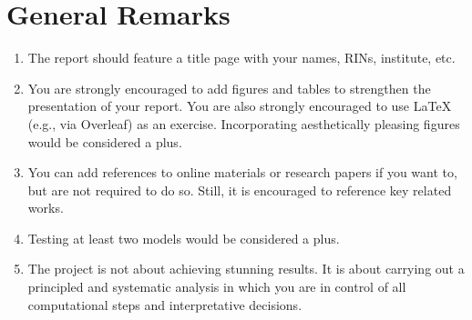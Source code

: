 \documentclass{article}
\begin{document}
\section*{General Remarks}
\begin{enumerate}
    \item The report should feature a title page with your names, RINs, institute, etc. 
    \item You are strongly encouraged to add figures and tables to strengthen the presentation of your report. You are also strongly encouraged to use LaTeX (e.g., via Overleaf) as an exercise. Incorporating aesthetically pleasing figures would be considered a plus.
    \item You can add references to online materials or research papers if you want to, but are not required to do so. Still, it is encouraged to reference key related works.
    \item Testing at least two models would be considered a plus.
    \item The project is not about achieving stunning results. It is about carrying out a principled and systematic analysis in which you are in control of all computational steps and interpretative decisions.
\end{enumerate}
\end{document}

